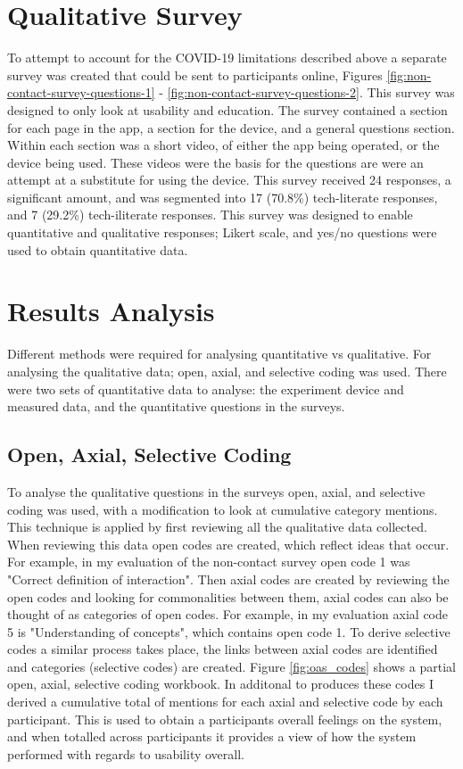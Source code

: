 \documentclass{l4proj}
\begin{document}
\section{Qualitative Survey}

To attempt to account for the COVID-19 limitations described above a separate survey was created that could be sent to participants online, Figures \ref{fig:non-contact-survey-questions-1} - \ref{fig:non-contact-survey-questions-2}. This survey was designed to only look at usability and education. The survey contained a section for each page in the app, a section for the device, and a general questions section. Within each section was a short video, of either the app being operated, or the device being used. These videos were the basis for the questions are were an attempt at a substitute for using the device. This survey received 24 responses, a significant amount, and was segmented into 17 (70.8\%) tech-literate responses, and 7 (29.2\%) tech-iliterate responses. This survey was designed to enable quantitative and qualitative responses; Likert scale, and yes/no questions were used to obtain quantitative data.

\section{Results Analysis}

Different methods were required for analysing quantitative vs qualitative. For analysing the qualitative data; open, axial, and selective coding \citep{williams_artofcoding_2019} was used. There were two sets of quantitative data to analyse: the experiment device and measured data, and the quantitative questions in the surveys.

\subsection{Open, Axial, Selective Coding}

To analyse the qualitative questions in the surveys open, axial, and selective coding was used, with a modification to look at cumulative category mentions. This technique is applied by first reviewing all the qualitative data collected. When reviewing this data open codes are created, which reflect ideas that occur. For example, in my evaluation of the non-contact survey open code 1 was "Correct definition of interaction". Then axial codes are created by reviewing the open codes and looking for commonalities between them, axial codes can also be thought of as categories of open codes. For example, in my evaluation axial code 5 is "Understanding of concepts", which contains open code 1. To derive selective codes a similar process takes place, the links between axial codes are identified and categories (selective codes) are created. Figure \ref{fig:oas_codes} shows a partial open, axial, selective coding workbook. In additonal to produces these codes I derived a cumulative total of mentions for each axial and selective code by each participant. This is used to obtain a participants overall feelings on the system, and when totalled across participants it provides a view of how the system performed with regards to usability overall.
\end{document}
